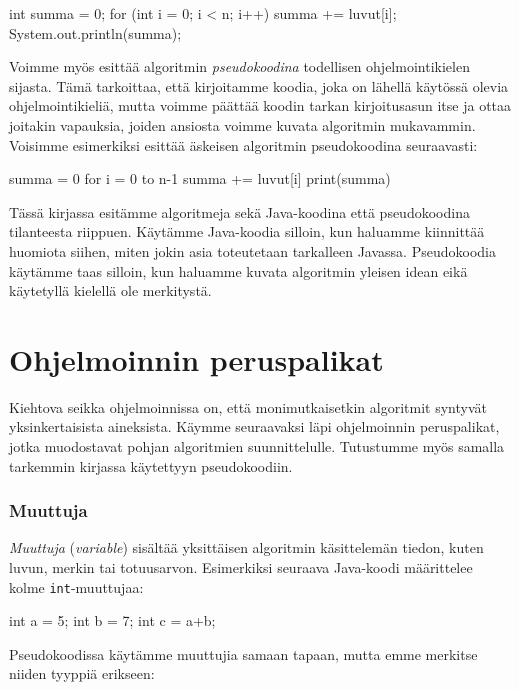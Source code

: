 \begin{code}
int summa = 0;
for (int i = 0; i < n; i++) {
    summa += luvut[i];
}
System.out.println(summa);
\end{code}


Voimme myös esittää algoritmin \emph{pseudokoodina}
todellisen ohjelmointikielen sijasta.
Tämä tarkoittaa, että kirjoitamme koodia,
joka on lähellä käytössä olevia ohjelmointikieliä, mutta voimme
päättää koodin tarkan kirjoitusasun itse ja ottaa joitakin vapauksia,
joiden ansiosta voimme kuvata algoritmin mukavammin.
Voisimme esimerkiksi esittää äskeisen algoritmin pseudokoodina seuraavasti:

\begin{code}
summa = 0
for i = 0 to n-1
    summa += luvut[i]
print(summa)
\end{code}

Tässä kirjassa esitämme algoritmeja sekä Java-koodina että pseudokoodina
tilanteesta riippuen.
Käytämme Java-koodia silloin, kun haluamme kiinnittää huomiota siihen,
miten jokin asia toteutetaan tarkalleen Javassa.
Pseudokoodia käytämme taas silloin, kun haluamme kuvata algoritmin yleisen
idean eikä käytetyllä kielellä ole merkitystä.

\section{Ohjelmoinnin peruspalikat}

Kiehtova seikka ohjelmoinnissa on, että monimutkaisetkin algoritmit
syntyvät yksinkertaisista aineksista.
Käymme seuraavaksi läpi ohjelmoinnin peruspalikat,
jotka muodostavat pohjan algoritmien suunnittelulle.
Tutustumme myös samalla tarkemmin kirjassa käytettyyn pseudokoodiin.

\subsubsection{Muuttuja}

\emph{Muuttuja} (\emph{variable}) sisältää yksittäisen algoritmin
käsittelemän tiedon, kuten luvun, merkin tai totuusarvon.
Esimerkiksi seuraava Java-koodi määrit\-telee kolme \texttt{int}-muuttujaa:

\begin{code}
int a = 5;
int b = 7;
int c = a+b;
\end{code}

Pseudokoodissa käytämme muuttujia samaan tapaan,
mutta emme merkitse niiden tyyppiä erikseen:

